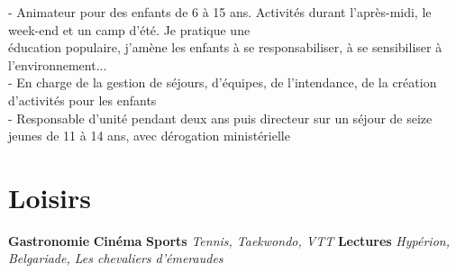 \documentclass[letterpaper,10pt]{article}
\begin{document}
  \hspace{15pt}- Animateur pour des enfants de 6 à 15 ans. Activités durant l'après-midi, le week-end et un camp d'été. Je pratique une\\
  \hspace{20pt}éducation populaire, j'amène les enfants à se responsabiliser, à se sensibiliser à l'environnement...\\
  \hspace{15pt}- En charge de la gestion de séjours, d'équipes, de l'intendance, de la création d'activités pour les enfants\\
  \hspace{15pt}- Responsable d'unité pendant deux ans puis directeur sur un séjour de seize jeunes de 11 à 14 ans, avec dérogation ministérielle
 


  \section{Loisirs}
    \hspace{10pt}\textbf{Gastronomie}
    \hfill\textbf{Cinéma}
    \hfill\textbf{Sports} \textit{Tennis, Taekwondo, VTT}
    \hfill\textbf{Lectures} \textit{Hypérion, Belgariade, Les chevaliers d'émeraudes}
\end{document}
